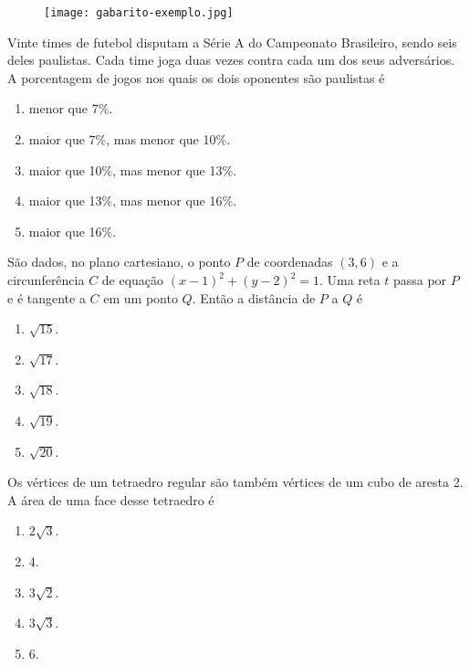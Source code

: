 \documentclass[twocolumn,landscape]{amsart}
\begin{document}
\begin{figure}[h!]
  \centering
  \texttt{[image: gabarito-exemplo.jpg]} %
\end{figure}

\thispagestyle{empty}

\cleardoublepage

\begin{questao}
  Vinte times de futebol disputam a Série A do Campeonato Brasileiro,
  sendo seis deles paulistas.  Cada time joga duas vezes contra cada um
  dos seus adversários. A porcentagem de jogos nos quais os dois
  oponentes são paulistas é
  \begin{enumerate}[\bf a.]
    \item menor que 7\%.
    \item maior que 7\%, mas menor que 10\%. %
    \item maior que 10\%, mas menor que 13\%.
    \item maior que 13\%, mas menor que 16\%.
    \item maior que 16\%.
  \end{enumerate}
\end{questao}
\clearpage

\begin{questao}
  São dados, no plano cartesiano, o ponto $P$ de coordenadas $(3,6)$ e a
  circunferência $C$ de equação $(x-1)^2+(y-2)^2=1$. Uma reta $t$ passa
  por $P$ e é tangente a $C$ em um ponto $Q$. Então a distância de $P$ a
  $Q$ é

  \begin{enumerate}[\bf a.]
    \item $\sqrt{15}$.
    \item $\sqrt{17}$.
    \item $\sqrt{18}$.
    \item $\sqrt{19}$. %
    \item $\sqrt{20}$.
  \end{enumerate}
\end{questao}
\clearpage

\begin{questao}
  Os vértices de um tetraedro regular são também vértices de um cubo de
  aresta 2. A área de uma face desse tetraedro é

  \begin{enumerate}[\bf a.]
    \item $2\sqrt{3}$. %
    \item 4.
    \item $3\sqrt{2}$.
    \item $3\sqrt{3}$.
    \item 6.
  \end{enumerate}
\end{questao}
\clearpage
\end{document}
